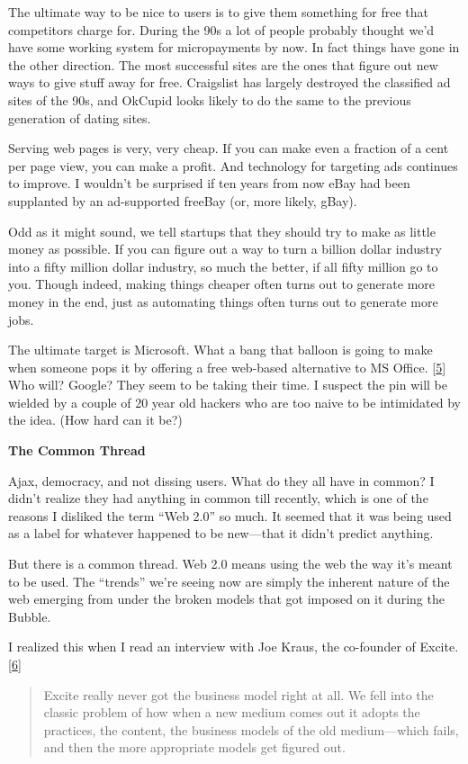 The ultimate way to be nice to users is to give them something for free
that competitors charge for. During the 90s a lot of people probably
thought we'd have some working system for micropayments by now. In fact
things have gone in the other direction. The most successful sites are
the ones that figure out new ways to give stuff away for free.
Craigslist has largely destroyed the classified ad sites of the 90s, and
OkCupid looks likely to do the same to the previous generation of dating
sites.

Serving web pages is very, very cheap. If you can make even a fraction
of a cent per page view, you can make a profit. And technology for
targeting ads continues to improve. I wouldn't be surprised if ten years
from now eBay had been supplanted by an ad-supported freeBay (or, more
likely, gBay).

Odd as it might sound, we tell startups that they should try to make as
little money as possible. If you can figure out a way to turn a billion
dollar industry into a fifty million dollar industry, so much the
better, if all fifty million go to you. Though indeed, making things
cheaper often turns out to generate more money in the end, just as
automating things often turns out to generate more jobs.

The ultimate target is Microsoft. What a bang that balloon is going to
make when someone pops it by offering a free web-based alternative to MS
Office. {[}\hyperref[f5n]{5}{]} Who will? Google? They seem to be taking
their time. I suspect the pin will be wielded by a couple of 20 year old
hackers who are too naive to be intimidated by the idea. (How hard can
it be?)

\textbf{The Common Thread}

Ajax, democracy, and not dissing users. What do they all have in common?
I didn't realize they had anything in common till recently, which is one
of the reasons I disliked the term ``Web 2.0'' so much. It seemed that
it was being used as a label for whatever happened to be new---that it
didn't predict anything.

But there is a common thread. Web 2.0 means using the web the way it's
meant to be used. The ``trends'' we're seeing now are simply the
inherent nature of the web emerging from under the broken models that
got imposed on it during the Bubble.

I realized this when I read an interview with Joe Kraus, the co-founder
of Excite. {[}\hyperref[f6n]{6}{]}

\begin{quote}
Excite really never got the business model right at all. We fell into
the classic problem of how when a new medium comes out it adopts the
practices, the content, the business models of the old medium---which
fails, and then the more appropriate models get figured out.
\end{quote}

